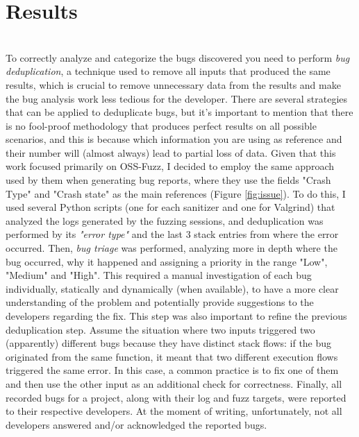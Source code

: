 \chapter{Results} \label{chap_4}
\ \\
To correctly analyze and categorize the bugs discovered you need to perform \textit{bug deduplication}, a technique used to remove all inputs that produced the same results, which is crucial to remove unnecessary data from the results and make the bug analysis work less tedious for the developer.
\newline
There are several strategies that can be applied to deduplicate bugs, but it's important to mention that there is no fool-proof methodology that produces perfect results on all possible scenarios, and this is because which information you are using as reference and their number will (almost always) lead to partial loss of data.
\newline
Given that this work focused primarily on OSS-Fuzz, I decided to employ the same approach used by them when generating bug reports, where they use the fields "Crash Type" and "Crash state" as the main references (Figure \ref{fig:issue}).
\newline
To do this, I used several Python scripts (one for each sanitizer and one for Valgrind) that analyzed the logs generated by the fuzzing sessions, and deduplication was performed by its \textit{"error type"} and the last 3 stack entries from where the error occurred.
\newline \newline
Then, \textit{bug triage} was performed, analyzing more in depth where the bug occurred, why it happened and assigning a priority in the range "Low", "Medium" and "High". This required a manual investigation of each bug individually, statically and dynamically (when available), to have a more clear understanding of the problem and potentially provide suggestions to the developers regarding the fix.
\newline
This step was also important to refine the previous deduplication step.
\newline
Assume the situation where two inputs triggered two (apparently) different bugs because they have distinct stack flows: if the bug originated from the same function, it meant that two different execution flows triggered the same error. In this case, a common practice is to fix one of them and then use the other input as an additional check for correctness.
\newline \newline
Finally, all recorded bugs for a project, along with their log and fuzz targets, were reported to their respective developers.
\newline
At the moment of writing, unfortunately, not all developers answered and/or acknowledged the reported bugs.






